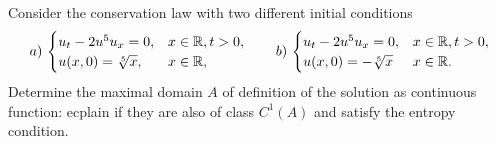 \newpage
\begin{exercise}
    Consider the conservation law with two different initial conditions
    \begin{equation*}
        a)\,\begin{cases}
            u_t - 2u^5 u_x = 0, & x \in \mathbb{R}, t > 0, \\
            u(x,0) = \sqrt[5]{x}, & x \in \mathbb{R},
        \end{cases}
        \qquad 
        b)\,\begin{cases}
            u_t - 2 u^5 u_x = 0, & x \in \mathbb{R}, t > 0, \\
            u(x,0) = -\sqrt[5]{x} & x \in \mathbb{R}.
        \end{cases}
    \end{equation*}
    Determine the maximal domain \(A\) of definition of the solution as continuous function: ecplain if they are also of class \(C^1(A)\) and satisfy the entropy condition.
\end{exercise}
